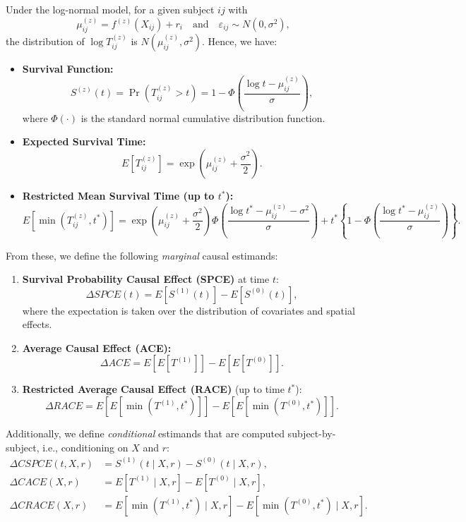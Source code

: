 \documentclass[useAMS,referee]{biom}
\begin{document}
Under the log-normal model, for a given subject \(ij\) with
\[
\mu_{ij}^{(z)} = f^{(z)}(X_{ij}) + r_i \quad \text{and} \quad \varepsilon_{ij}\sim N(0,\sigma^2),
\]
the distribution of \(\log T_{ij}^{(z)}\) is \(N(\mu_{ij}^{(z)},\sigma^2)\). Hence, we have:
\begin{itemize}
    \item \textbf{Survival Function:}  
    \[
    S^{(z)}(t) = \Pr(T_{ij}^{(z)} > t) = 1 - \Phi\left(\frac{\log t - \mu_{ij}^{(z)}}{\sigma}\right),
    \]
    where \(\Phi(\cdot)\) is the standard normal cumulative distribution function.

    \item \textbf{Expected Survival Time:}  
    \[
    E[T_{ij}^{(z)}] = \exp\left(\mu_{ij}^{(z)} + \frac{\sigma^2}{2}\right).
    \]

    \item \textbf{Restricted Mean Survival Time (up to \(t^*\)):}  
    \[
    E\left[\min\left(T_{ij}^{(z)}, t^*\right)\right] = \exp\left(\mu_{ij}^{(z)} + \frac{\sigma^2}{2}\right)\Phi\left(\frac{\log t^* - \mu_{ij}^{(z)} - \sigma^2}{\sigma}\right) + t^*\left\{1 - \Phi\left(\frac{\log t^* - \mu_{ij}^{(z)}}{\sigma}\right)\right\}.
    \]
\end{itemize}

From these, we define the following \emph{marginal} causal estimands:
\begin{enumerate}
    \item \textbf{Survival Probability Causal Effect (SPCE)} at time \(t\):
    \[
    \Delta SPCE(t) = E\left[S^{(1)}(t)\right] - E\left[S^{(0)}(t)\right],
    \]
    where the expectation is taken over the distribution of covariates and spatial effects.

    \item \textbf{Average Causal Effect (ACE):}
    \[
    \Delta ACE = E\left[E[T^{(1)}]\right] - E\left[E[T^{(0)}]\right].
    \]

    \item \textbf{Restricted Average Causal Effect (RACE)} (up to time \(t^*\)):
    \[
    \Delta RACE = E\left[E\left[\min\left(T^{(1)}, t^*\right)\right]\right] - E\left[E\left[\min\left(T^{(0)}, t^*\right)\right]\right].
    \]
\end{enumerate}

Additionally, we define \emph{conditional} estimands that are computed subject-by-subject, i.e., conditioning on \(X\) and \(r\):
\begin{align*}
\Delta CSPCE(t, X, r) &= S^{(1)}(t \mid X, r) - S^{(0)}(t \mid X, r), \\
\Delta CACE(X, r) &= E[T^{(1)} \mid X, r] - E[T^{(0)} \mid X, r], \\
\Delta CRACE(X, r) &= E\left[\min\left(T^{(1)}, t^*\right) \mid X, r\right] - E\left[\min\left(T^{(0)}, t^*\right) \mid X, r\right].
\end{align*}
\end{document}
